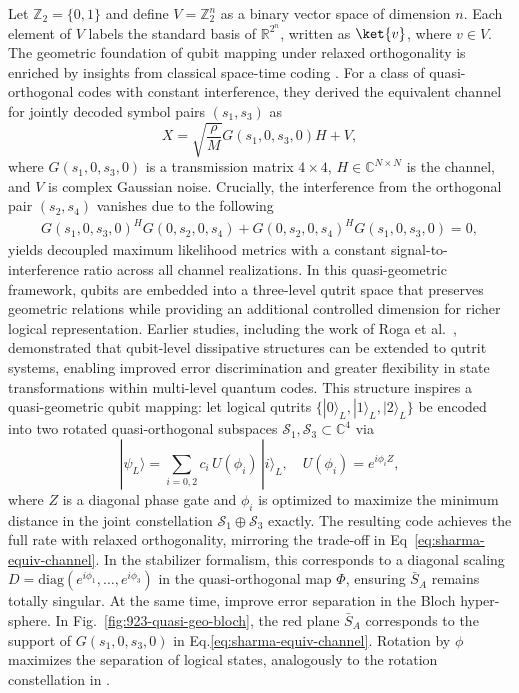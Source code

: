 \documentclass{iopjournal}
\theoremstyle{thmstyleone}%
\theoremstyle{thmstyletwo}%
\theoremstyle{thmstylethree}%
\begin{document}
Let \( \mathbb{Z}_2 = \{0, 1\} \) and define \( V = \mathbb{Z}_2^n \) as a binary vector space of dimension \( n \). Each element of \( V \) labels the standard basis of \( \mathbb{R}^{2^n} \), written as \( \ket{v} \), where \( v \in V \).
The geometric foundation of qubit mapping under relaxed orthogonality is enriched by insights from classical space-time coding \cite{Sharma2002improve}. For a class of quasi-orthogonal codes with constant interference, they derived the equivalent channel for jointly decoded symbol pairs $(s_1, s_3)$ as
\begin{equation}
\label{eq:sharma-equiv-channel}
X = \sqrt{\frac{\rho}{M}} G(s_1, 0, s_3, 0) H + V,
\end{equation}
where $G(s_1, 0, s_3, 0)$ is a transmission matrix $4 \times 4$, $H \in \mathbb{C}^{N\times N}$ is the channel, and $V$ is complex Gaussian noise. Crucially, the interference from the orthogonal pair $(s_2, s_4)$ vanishes due to the following
\begin{equation}
\begin{aligned}
G(s_1,0,s_3,0)^H G(0,s_2,0,s_4)+ G(0,s_2,0,s_4)^H G(s_1,0,s_3,0) = 0, 
\label{eq: GGG}
\end{aligned}
\end{equation}
yields decoupled maximum likelihood metrics with a constant signal-to-interference ratio across all channel realizations. In this quasi-geometric framework, qubits are embedded into a three-level qutrit space that preserves geometric relations while providing an additional controlled dimension for richer logical representation. Earlier studies, including the work of Roga et al.~\cite{Roga2010davies}, demonstrated that qubit-level dissipative structures can be extended to qutrit systems, enabling improved  error discrimination and greater flexibility in state transformations within multi-level quantum codes. 
This structure inspires a quasi-geometric qubit mapping: let logical qutrits $\{|0\rangle_L, |1\rangle_L, |2\rangle_L\}$ be encoded into two rotated quasi-orthogonal subspaces $\mathcal{S}_1, \mathcal{S}_3 \subset \mathbb{C}^4$ via
\begin{equation}
|\psi_L\rangle = \sum_{i=0,2} c_i \, U(\phi_i) \, |i\rangle_L, \quad U(\phi_i) = e^{i \phi_i Z},
\end{equation}
where $Z$ is a diagonal phase gate and $\phi_i$ is optimized to maximize the minimum distance in the joint constellation $\mathcal{S}_1 \oplus \mathcal{S}_3$  exactly. The resulting code achieves the full rate with relaxed orthogonality, mirroring the trade-off in Eq~\eqref{eq:sharma-equiv-channel}. In the stabilizer formalism, this corresponds to a diagonal scaling $D = \text{diag}(e^{i\phi_1}, \dots, e^{i\phi_3})$ in the quasi-orthogonal map $\Phi$, ensuring $\bar{S}_A$ remains totally singular. At the same time, improve error separation in the Bloch hyper-sphere. In Fig.~\ref{fig:923-quasi-geo-bloch}, the red plane $\bar{S}_A$ corresponds to the support of $G(s_1,0,s_3,0)$ in Eq.\eqref{eq:sharma-equiv-channel}. Rotation by $\phi$  maximizes the separation of logical states, analogously to the rotation constellation  in \cite{Sharma2002improve}.
\end{document}
